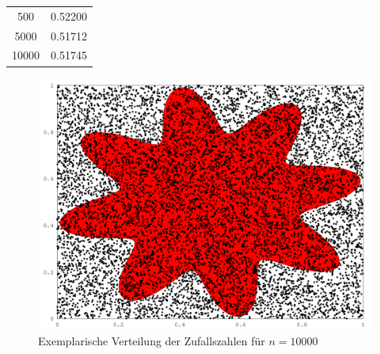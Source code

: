 \documentclass{mywork}
\begin{document}
\begin{aufgabe}
\begin{enumerate}[a)]
\begin{table}[h]
\begin{tabular}{c|r}
					500 & 0.52200 \\
					5000 & 0.51712 \\
					10000 & 0.51745
				\end{tabular}
			\end{table}
			\begin{figure}[h]
				\centering
				\caption{Exemplarische Verteilung der Zufallszahlen für $n=10000$}
				\includegraphics[scale=0.4]{num1_9_4/c.png}
			\end{figure}
						
	\end{enumerate}
\end{aufgabe}
\end{document}
